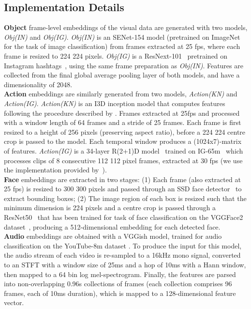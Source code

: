 \documentclass{bmvc2k}
\begin{document}
\subsection{Implementation Details} \label{subsec:abl-details}
\textbf{Object} frame-level embeddings of the visual data are generated with two models, \textit{Obj(IN)} and \textit{Obj(IG)}.  \textit{Obj(IN)} is an SENet-154 model \cite{hu2019squeeze} (pretrained on ImageNet for the task of image classification) from frames extracted at 25 fps, where each frame is resized to 224  224 pixels. \textit{Obj(IG)} is a ResNext-101~\cite{xie2017aggregated} pretrained on Instagram hashtags~\cite{mahajan2018exploring}, using the same frame preparation as \textit{Obj(IN)}.  Features are collected from the final global average pooling layer of both models, and have a dimensionality of 2048. \\ 
\textbf{Action} embeddings are similarly generated from two models, \textit{Action(KN)} and \textit{Action(IG)}.  \textit{Action(KN)} is an I3D inception model that computes features following the procedure described by \cite{carreira2017quo}.  Frames extracted at 25fps and processed with a window length of 64 frames and a stride of 25 frames.  Each frame is first resized to a height of 256 pixels (preserving aspect ratio), before a 224  224 centre crop is passed to the model.  Each temporal window produces a (1024x7)-matrix of features. \textit{Action(IG)} is a 34-layer R(2+1)D model~\cite{tran2018closer} trained on IG-65m~\cite{ghadiyaram2019large} which processes clips of 8 consecutive 112  112 pixel frames, extracted at 30 fps (we use the implementation provided by~\cite{Daniel}). \\ 
\textbf{Face} embeddings are extracted in two stages: (1) Each frame (also extracted at 25 fps) is resized to 300  300 pixels and passed through an SSD face detector~\cite{liu2016ssd,opencv_library} to extract bounding boxes; (2) The image region of each box is resized such that the minimum dimension is 224 pixels and a centre crop is passed through a ResNet50~\cite{he2016identity} that has been trained for task of face classification on the VGGFace2 dataset~\cite{Cao18}, producing a 512-dimensional embedding for each detected face. \\
\textbf{Audio} embeddings are obtained with a VGGish model, trained for audio classification on the YouTube-8m dataset \cite{hershey2017}. To produce the input for this model, the audio stream of each video is re-sampled to a 16kHz mono signal, converted to an STFT with a window size of 25ms and a hop of 10ms with a Hann window, then mapped to a 64 bin log mel-spectrogram.  Finally, the features are parsed into non-overlapping 0.96s collections of frames (each collection comprises 96 frames, each of 10ms duration), which is mapped to a 128-dimensional feature vector. \\
\end{document}
